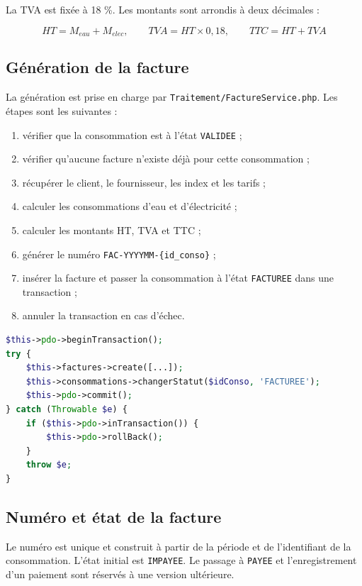 La TVA est fixée à 18 \%. Les montants sont arrondis à deux décimales :

\[
HT = M_{eau} + M_{elec}, \qquad TVA = HT \times 0{,}18, \qquad TTC = HT + TVA
\]

\subsection{Génération de la facture}

La génération est prise en charge par \texttt{Traitement/FactureService.php}. Les étapes sont les suivantes :

\begin{enumerate}[leftmargin=*]
  \item vérifier que la consommation est à l'état \texttt{VALIDEE} ;
  \item vérifier qu'aucune facture n'existe déjà pour cette consommation ;
  \item récupérer le client, le fournisseur, les index et les tarifs ;
  \item calculer les consommations d'eau et d'électricité ;
  \item calculer les montants HT, TVA et TTC ;
  \item générer le numéro \texttt{FAC-YYYYMM-\{id\_conso\}} ;
  \item insérer la facture et passer la consommation à l'état \texttt{FACTUREE} dans une transaction ;
  \item annuler la transaction en cas d'échec.
\end{enumerate}

\begin{lstlisting}[language=PHP,caption={Principe de génération transactionnelle},label={lst:facture}]
$this->pdo->beginTransaction();
try {
    $this->factures->create([...]);
    $this->consommations->changerStatut($idConso, 'FACTUREE');
    $this->pdo->commit();
} catch (Throwable $e) {
    if ($this->pdo->inTransaction()) {
        $this->pdo->rollBack();
    }
    throw $e;
}
\end{lstlisting}

\subsection{Numéro et état de la facture}

Le numéro est unique et construit à partir de la période et de l'identifiant de la consommation. L'état initial est \texttt{IMPAYEE}. Le passage à \texttt{PAYEE} et l'enregistrement d'un paiement sont réservés à une version ultérieure.

